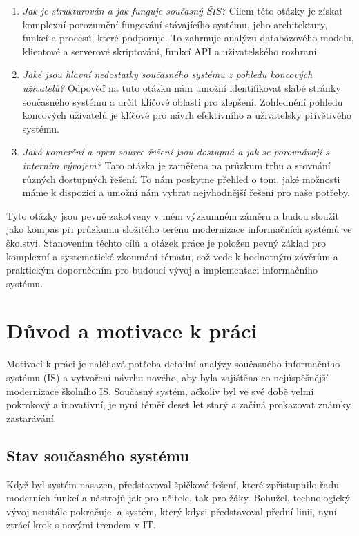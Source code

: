 \documentclass[FM,Proj]{tulthesis}
\begin{document}
\begin{enumerate}
\item \textit{Jak je strukturován a jak funguje současný ŠIS?} 
Cílem této otázky je získat komplexní porozumění fungování stávajícího systému, 
jeho architektury, funkcí a procesů, které podporuje. To zahrnuje analýzu 
databázového modelu, klientové a serverové skriptování, funkcí API a uživatelského rozhraní.

\item \textit{Jaké jsou hlavní nedostatky současného systému z pohledu koncových uživatelů?}
 Odpověď na tuto otázku nám umožní identifikovat slabé stránky současného systému a 
 určit klíčové oblasti pro zlepšení. Zohlednění pohledu koncových uživatelů je 
 klíčové pro návrh efektivního a uživatelsky přívětivého systému.

\item \textit{Jaká komerční a open source řešení jsou dostupná a jak se porovnávají s 
interním vývojem?} Tato otázka je zaměřena na průzkum trhu a srovnání různých dostupných 
řešení. To nám poskytne přehled o tom, jaké možnosti máme k dispozici a umožní nám vybrat 
nejvhodnější řešení pro naše potřeby.
\end{enumerate}

Tyto otázky jsou pevně zakotveny v mém výzkumném záměru a budou sloužit jako kompas 
při průzkumu složitého terénu modernizace informačních systémů ve školství.
Stanovením těchto cílů a otázek práce je položen pevný základ pro komplexní a 
systematické zkoumání tématu, což vede k hodnotným závěrům a praktickým 
doporučením pro budoucí vývoj a implementaci informačního systému.

\section{Důvod a motivace k práci}
Motivací k práci je naléhavá potřeba detailní analýzy současného informačního 
systému (IS) a vytvoření návrhu nového, aby byla zajištěna co nejúspěšnější 
modernizace školního IS. Současný systém, ačkoliv byl ve své době velmi pokrokový 
a inovativní, je nyní téměř deset let starý a začíná prokazovat známky zastarávání.

\subsection*{Stav současného systému}
Když byl systém nasazen, představoval špičkové řešení, které zpřístupnilo řadu 
moderních funkcí a nástrojů jak pro učitele, tak pro žáky. Bohužel, 
technologický vývoj neustále pokračuje, a systém, který kdysi představoval 
přední linii, nyní ztrácí krok s novými trendem v IT.
\end{document}
